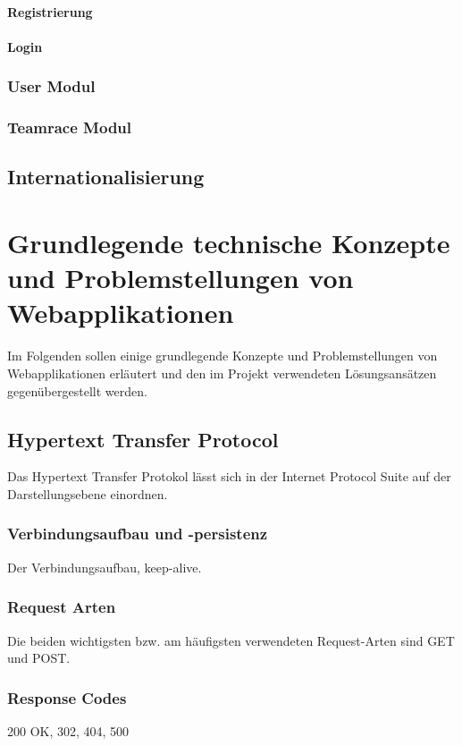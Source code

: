 \documentclass[12pt]{report}
\begin{document}
\subsubsection{Registrierung}
\subsubsection{Login}

\subsection{User Modul}

\subsection{Teamrace Modul}
\section{Internationalisierung}
\label{sec:Internationalisierung}


\chapter{Grundlegende technische Konzepte und Problemstellungen von Webapplikationen}

Im Folgenden sollen einige grundlegende Konzepte und Problemstellungen von Webapplikationen erläutert und den im Projekt verwendeten Lösungsansätzen gegenübergestellt werden. 

\section{Hypertext Transfer Protocol}
Das Hypertext Transfer Protokol lässt sich in der Internet Protocol Suite auf der Darstellungsebene einordnen.\cite{wiki:HTTP}
\subsection{Verbindungsaufbau und -persistenz}
Der Verbindungsaufbau, keep-alive.
\subsection{Request Arten}
Die beiden wichtigsten bzw. am häufigsten verwendeten Request-Arten sind GET und POST.
\subsection{Response Codes}
200 OK, 302, 404, 500
\end{document}
